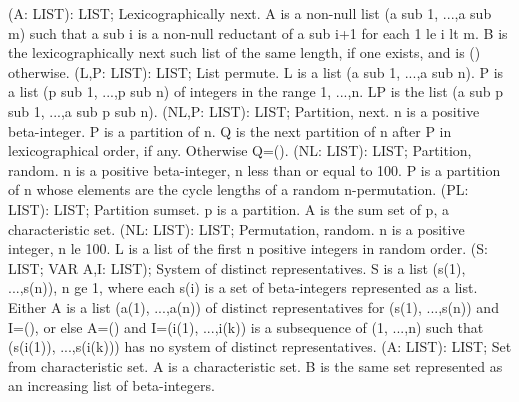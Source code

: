  (A: LIST): LIST; \eproc
\bcom Lexicographically next. A is a non-null list (a sub 1, ...,a sub m)
such that a sub i is a non-null reductant of a sub i+1 for each
1 le i lt m.  B is the lexicographically next such list of the same
length, if one exists, and is () otherwise. \ecom 
{} (L,P: LIST): LIST; \eproc
\bcom List permute. L is a list (a sub 1, ...,a sub n). P is a list
(p sub 1, ...,p sub n) of integers in the range 1, ...,n.  LP is the
list (a sub p sub 1, ...,a sub p sub n). \ecom 
{} (NL,P: LIST): LIST; \eproc
\bcom Partition, next. n is a positive beta-integer. P is a partition of
n.  Q is the next partition of n after P in lexicographical order,
if any. Otherwise Q=(). \ecom 
{} (NL: LIST): LIST; \eproc
\bcom Partition, random. n is a positive beta-integer, n less than or
equal to 100.  P is a partition of n whose elements are the cycle
lengths of a random n-permutation. \ecom 
{} (PL: LIST): LIST; \eproc
\bcom Partition sumset. p is a partition. A is the sum set of p,
a characteristic set. \ecom 
{} (NL: LIST): LIST; \eproc
\bcom Permutation, random. n is a positive integer, n le 100. L is a
list of the first n positive integers in random order. \ecom 
{} (S: LIST; VAR A,I: LIST); \eproc
\bcom System of distinct representatives. S is a list (s(1), ...,s(n)),
n ge 1, where each s(i) is a set of beta-integers represented as a
list.  Either A is a list (a(1), ...,a(n)) of distinct
representatives for (s(1), ...,s(n)) and I=(), or else A=() and
I=(i(1), ...,i(k)) is a subsequence of (1, ...,n) such that
(s(i(1)), ...,s(i(k))) has no system of distinct representatives. \ecom 
{} (A: LIST): LIST; \eproc
\bcom Set from characteristic set. A is a characteristic set. B is the
same set represented as an increasing list of beta-integers. \ecom 
